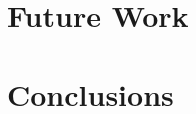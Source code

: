 \documentclass[12pt]{report}
\begin{document}
%

\chapter{Future Work}


\chapter{Conclusions}








\appendix

\end{document}
